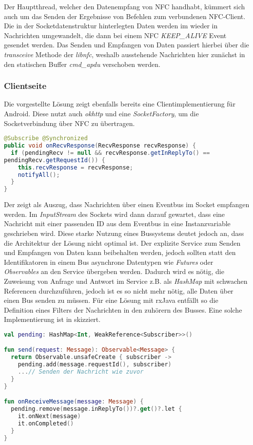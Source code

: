	    Der Hauptthread, welcher den Datenempfang von NFC handhabt, kümmert sich auch um das Senden der Ergebnisse von Befehlen zum verbundenen NFC-Client. Die in der Socketdatenstruktur hinterlegten Daten werden im  wieder in Nachrichten umgewandelt, die dann bei einem NFC {\it KEEP\_ALIVE} Event gesendet werden. Das Senden und Empfangen von Daten passiert hierbei über die {\it transceive} Methode der {\it libnfc}, weshalb ausstehende Nachrichten hier zunächst in den statischen Buffer {\it cmd\_apdu} verschoben werden.
	    
	\subsubsection{Clientseite}
	    Die vorgestellte Lösung zeigt ebenfalls bereits eine Clientimplementierung für Android. Diese nutzt auch {\it okhttp} und eine {\it SocketFactory}, um die Socketverbindung über NFC zu übertragen.
	    \begin{lstlisting}[frame=bt, label={lst:nfc:apdu}, language=Java, caption=Datenempfang über NFC (Clientcode in Java) \cite{nfcSocketsClient}]
@Subscribe @Synchronized
public void onRecvResponse(RecvResponse recvResponse) {
  if (pendingRecv != null && recvResponse.getInReplyTo() ==
pendingRecv.getRequestId()) {
    this.recvResponse = recvResponse;
    notifyAll();
  }
}
        \end{lstlisting}
        Der  zeigt als Auszug, dass Nachrichten über einen Eventbus im Socket empfangen werden. Im {\it InputStream} des Sockets wird dann darauf gewartet, dass eine Nachricht mit einer passenden ID aus dem Eventbus in eine Instanzvariable geschrieben wird. Diese starke Nutzung eines Bussystems deutet jedoch an, dass die Architektur der Lösung nicht optimal ist. Der explizite Service zum Senden und Empfangen von Daten kann beibehalten werden, jedoch sollten statt den Identifikatoren in einem Bus asynchrone Datentypen wie {\it Futures} oder {\it Observables} an den Service übergeben werden. Dadurch wird es nötig, die Zuweisung von Anfrage und Antwort im Service z.B. als {\it HashMap} mit schwachen Referencen durchzuführen, jedoch ist es so nicht mehr nötig, alle Daten über einen Bus senden zu müssen. Für eine Lösung mit rxJava entfällt so die Definition eines Filters der Nachrichten in den zuhörern des Busses. Eine solche Implementierung ist in  skizziert.
        \begin{lstlisting}[frame=bt, label={lst:nfc:apduAsync}, language=Kotlin, caption=Datenempfang über Observables (Clientcode in Kotlin)]
val pending: HashMap<Int, WeakReference<Subscriber>>()

fun send(request: Message): Observable<Message> {
  return Observable.unsafeCreate { subscriber ->
    pending.add(message.requestId(), subscriber)
    ...// Senden der Nachricht wie zuvor
  }
}

fun onReceiveMessage(message: Message) {
  pending.remove(message.inReplyTo())?.get()?.let {
    it.onNext(message)
    it.onCompleted()
  }
}
        \end{lstlisting}
        
